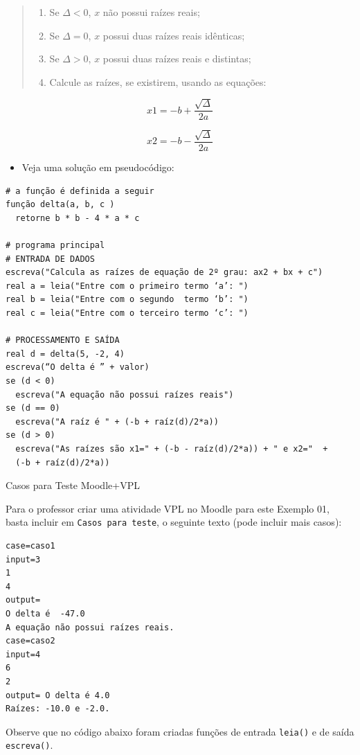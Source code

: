 \documentclass[12pt,a4paper]{article}
\providecommand{\tightlist}{%
      \setlength{\itemsep}{0pt}\setlength{\parskip}{0pt}}
\begin{document}
\begin{quote}
\begin{enumerate}
\def\labelenumi{\arabic{enumi}.}
\tightlist
\item
  Se \(\Delta<0\), \(x\) não possui raízes reais;
\item
  Se \(\Delta=0\), \(x\) possui duas raízes reais idênticas;
\item
  Se \(\Delta>0\), \(x\) possui duas raízes reais e distintas;
\item
  Calcule as raízes, se existirem, usando as equações:
\end{enumerate}
\end{quote}

\[x1 = -b+\frac{\sqrt{\Delta}}{2a}\]

\[x2 = -b-\frac{\sqrt{\Delta}}{2a}\]

\begin{itemize}
\tightlist
\item
  Veja uma solução em pseudocódigo:
\end{itemize}

    \begin{verbatim}
# a função é definida a seguir
função delta(a, b, c )
  retorne b * b - 4 * a * c

# programa principal  
# ENTRADA DE DADOS
escreva("Calcula as raízes de equação de 2º grau: ax2 + bx + c")
real a = leia("Entre com o primeiro termo ‘a’: ")
real b = leia("Entre com o segundo  termo ‘b’: ")
real c = leia("Entre com o terceiro termo ‘c’: ")

# PROCESSAMENTO E SAÍDA
real d = delta(5, -2, 4)
escreva(“O delta é ” + valor)
se (d < 0)  
  escreva("A equação não possui raízes reais")
se (d == 0)
  escreva("A raíz é " + (-b + raíz(d)/2*a))
se (d > 0)  
  escreva("As raízes são x1=" + (-b - raíz(d)/2*a)) + " e x2="  +
  (-b + raíz(d)/2*a))
\end{verbatim}

    Casos para Teste Moodle+VPL

Para o professor criar uma atividade VPL no Moodle para este Exemplo 01,
basta incluir em \texttt{Casos\ para\ teste}, o seguinte texto (pode
incluir mais casos):

\begin{verbatim}
case=caso1
input=3
1
4
output=
O delta é  -47.0
A equação não possui raízes reais.
case=caso2
input=4
6
2
output= O delta é 4.0
Raízes: -10.0 e -2.0.
\end{verbatim}

    Observe que no código abaixo foram criadas funções de entrada
\texttt{leia()} e de saída \texttt{escreva()}.
\end{document}
